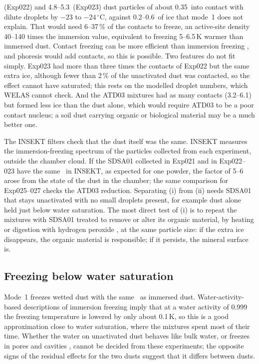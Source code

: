(Exp022) and 4.8--5.3\cmc\ (Exp023) dust particles of about 0.35\um\ into contact with dilute droplets by $-23$ to $-24\,^\circ$C, against 0.2--0.6\cmc\ of ice that mode~1 does not explain. That would need 6--37\,\% of the contacts to freeze, an active-site density 40--140 times the immersion value, equivalent to freezing 5--6.5\,K warmer than immersed dust. Contact freezing can be more efficient than immersion freezing , and phoresis would add contacts, so this is possible. Two features do not fit simply. Exp023 had more than three times the contacts of Exp022 but the same extra ice, although fewer than 2\,\% of the unactivated dust was contacted, so the effect cannot have saturated; this rests on the modelled droplet numbers, which WELAS cannot check. And the ATD03 mixtures had as many contacts (3.2--6.1\cmc) but formed less ice than the dust alone, which would require ATD03 to be a poor contact nucleus; a soil dust carrying organic or biological material may be a much better one.

The INSEKT filters check that the dust itself was the same. INSEKT measures the immersion-freezing spectrum of the particles collected from each experiment, outside the chamber cloud. If the SDSA01 collected in Exp021 and in Exp022--023 have the same \ns\ in INSEKT, as expected for one powder, the factor of 5--6 arose from the state of the dust in the chamber; the same comparison for Exp025--027 checks the ATD03 reduction. Separating (i) from (ii) needs SDSA01 that stays unactivated with no small droplets present, for example dust alone held just below water saturation. The most direct test of (i) is to repeat the mixtures with SDSA01 treated to remove or alter its organic material, by heating or digestion with hydrogen peroxide \citep{OSullivan2014}, at the same particle size: if the extra ice disappears, the organic material is responsible; if it persists, the mineral surface is. 

\subsection{Freezing below water saturation}

Mode~1 freezes wetted dust with the same \ns\ as immersed dust. Water-activity-based descriptions of immersion freezing \citep{Koop2000,KnopfAlpert2013} imply that at a water activity of 0.999 the freezing temperature is lowered by only about 0.1\,K, so this is a good approximation close to water saturation, where the mixtures spent most of their time. Whether the water on unactivated dust behaves like bulk water, or freezes in pores and cavities \citep{Marcolli2014}, cannot be decided from these experiments; the opposite signs of the residual effects for the two dusts suggest that it differs between dusts.

